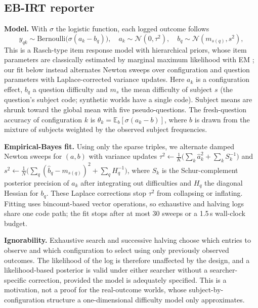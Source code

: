 \documentclass{article}
\begin{document}
\subsection{EB-IRT reporter}
\textbf{Model.} With $\sigma$ the logistic function, each logged outcome follows
\begin{equation}
y_{qk}\sim\mathrm{Bernoulli}\big(\sigma(a_k-b_q)\big),\quad a_k\sim\mathcal N(0,\tau^2),\quad b_q\sim\mathcal N(m_{s(q)},s^2),
\end{equation}
This is a Rasch-type item response model with hierarchical priors, whose item parameters are classically estimated by marginal maximum likelihood with EM \citep{Bock1981MML}; our fit below instead alternates Newton sweeps over configuration and question parameters with Laplace-corrected variance updates. Here $a_k$ is a configuration effect, $b_q$ a question difficulty and $m_{s}$ the mean difficulty of subject $s$ (the question's subject code; synthetic worlds have a single code). Subject means are shrunk toward the global mean with five pseudo-questions. The fresh-question accuracy of configuration $k$ is $\theta_k=\mathbb E_b[\sigma(a_k-b)]$, where $b$ is drawn from the mixture of subjects weighted by the observed subject frequencies.

\textbf{Empirical-Bayes fit.} Using only the sparse triples, we alternate damped Newton sweeps for $(a,b)$ with variance updates $\tau^2\leftarrow\frac1K\big(\sum_k\hat a_k^2+\sum_k S_k^{-1}\big)$ and $s^2\leftarrow\frac1N\big(\sum_q(\hat b_q-m_{s(q)})^2+\sum_q H_q^{-1}\big)$, where $S_k$ is the Schur-complement posterior precision of $a_k$ after integrating out difficulties and $H_q$ the diagonal Hessian for $b_q$. These Laplace corrections stop $\tau^2$ from collapsing or inflating. Fitting uses bincount-based vector operations, so exhaustive and halving logs share one code path; the fit stops after at most 30 sweeps or a 1.5\,s wall-clock budget.

\textbf{Ignorability.} Exhaustive search and successive halving choose which entries to observe and which configuration to select using only previously observed outcomes. The likelihood of the log is therefore unaffected by the design, and a likelihood-based posterior is valid under either searcher without a searcher-specific correction, provided the model is adequately specified. This is a motivation, not a proof for the real-outcome worlds, whose subject-by-configuration structure a one-dimensional difficulty model only approximates.
\end{document}
